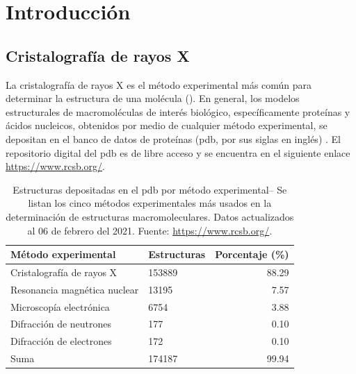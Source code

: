 \chapter{Introducción}
\section{Cristalografía de rayos X}

La cristalografía de rayos X es el método experimental más común para determinar la estructura de una molécula (). En general, los modelos estructurales de macromoléculas de interés biológico, específicamente proteínas y ácidos nucleicos, obtenidos por medio de cualquier método experimental, se depositan en el banco de datos de proteínas (\acrshort{pdb}, por sus siglas en inglés) . El repositorio digital del \acrshort{pdb} es de libre acceso y se encuentra en el siguiente enlace \url{https://www.rcsb.org/}. 

\begin{table}[h]
	\centering
	\begin{tabular}{@{}llr@{}}
		\toprule
		Método experimental & Estructuras  & Porcentaje (\si{\percent})       \\ 
		\midrule
		Cristalografía de rayos X        & 153889 & 88.29 \\
		Resonancia magnética nuclear & 13195  & 7.57  \\
		Microscopía electrónica      & 6754   & 3.88  \\
		Difracción de neutrones	     & 177    & 0.10  \\
		Difracción de electrones     & 172    & 0.10  \\
		\midrule
		Suma                         & 174187 & 99.94 \\ \bottomrule
	\end{tabular}%
	\caption[Estructuras por método experimental]{Estructuras depositadas en el \acrshort{pdb} por método experimental-- Se listan los cinco métodos experimentales más usados en la determinación de estructuras macromoleculares. Datos actualizados al 06 de febrero del 2021. Fuente: \url{https://www.rcsb.org/}.}
\end{table}

